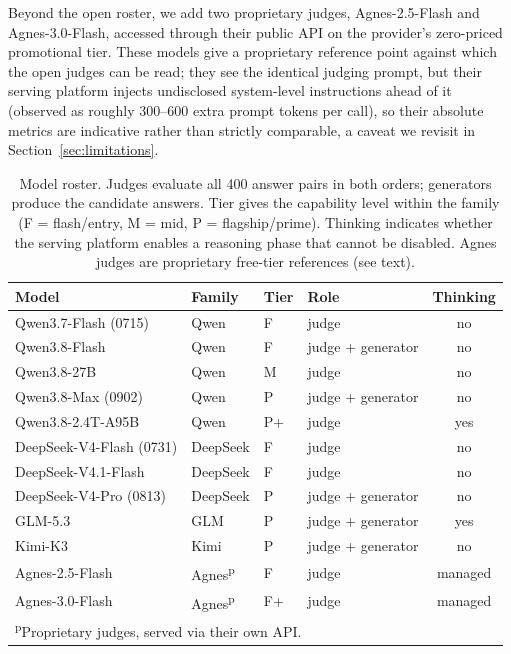 \documentclass[review,12pt]{elsarticle}
\begin{document}
Beyond the open roster, we add two proprietary judges, Agnes-2.5-Flash and
Agnes-3.0-Flash, accessed through their public API on the provider's
zero-priced promotional tier. These models give a proprietary reference
point against which the open judges can be read; they see the identical
judging prompt, but their serving platform injects undisclosed
system-level instructions ahead of it (observed as roughly 300--600 extra
prompt tokens per call), so their absolute metrics are indicative rather
than strictly comparable, a caveat we revisit in Section~\ref{sec:limitations}.

\begin{table}[t]
\centering
\small
\caption{Model roster. Judges evaluate all 400 answer pairs in both orders;
generators produce the candidate answers. Tier gives the capability level
within the family (F = flash/entry, M = mid, P = flagship/prime). Thinking
indicates whether the serving platform enables a reasoning phase that cannot
be disabled. Agnes judges are proprietary free-tier references (see text).}
\label{tab:roster}
\begin{tabular}{llllc}
\toprule
Model & Family & Tier & Role & Thinking \\
\midrule
Qwen3.7-Flash (0715)  & Qwen     & F & judge & no  \\
Qwen3.8-Flash         & Qwen     & F & judge + generator & no  \\
Qwen3.8-27B           & Qwen     & M & judge & no  \\
Qwen3.8-Max (0902)    & Qwen     & P & judge + generator & no  \\
Qwen3.8-2.4T-A95B     & Qwen     & P+ & judge & yes \\
\midrule
DeepSeek-V4-Flash (0731) & DeepSeek & F & judge & no  \\
DeepSeek-V4.1-Flash   & DeepSeek & F & judge & no  \\
DeepSeek-V4-Pro (0813)& DeepSeek & P & judge + generator & no  \\
\midrule
GLM-5.3               & GLM      & P & judge + generator & yes \\
Kimi-K3               & Kimi     & P & judge + generator & no  \\
\midrule
Agnes-2.5-Flash       & Agnes\textsuperscript{p} & F & judge & managed \\
Agnes-3.0-Flash       & Agnes\textsuperscript{p} & F+ & judge & managed \\
\bottomrule
\multicolumn{5}{l}{\footnotesize \textsuperscript{p}Proprietary judges, served via their own API.}
\end{tabular}
\end{table}
\end{document}
